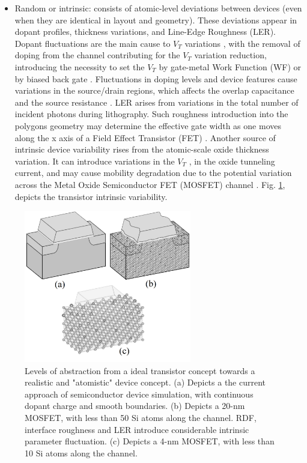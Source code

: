 \documentclass[pgmicro,mestrado,english]{iiufrgs}
\begin{document}
\begin{itemize}
        \item Random or intrinsic: consists of atomic-level deviations between devices (even when they are identical in layout and geometry). These deviations appear in dopant profiles, thickness variations, and Line-Edge Roughness (LER). Dopant fluctuations are the main cause to $V_T$ variations \cite{asenov2003simulation}, with the removal of doping from the channel contributing for the $V_T$ variation reduction, introducing the necessity to set the $V_T$ by gate-metal Work Function (WF) or by biased back gate \cite{frank2001device,wong1999nanoscale}. Fluctuations in doping levels and device features cause variations in the source/drain regions, which affects the overlap capacitance and the source resistance \cite{frank2000simulation}. LER arises from variations in the total number of incident photons during lithography. Such roughness introduction into the polygons geometry may determine the effective gate width as one moves along the x axis of a Field Effect Transistor (FET) \cite{brunner2003optical}.
        Another source of intrinsic device variability rises from the atomic-scale oxide thickness variation. It can introduce variations in the $V_T$ \cite{asenov2003simulation}, in the oxide tunneling current, and may cause mobility degradation due to the potential variation across the Metal Oxide Semiconductor FET (MOSFET) channel \cite{bernstein2006high}. Fig. \ref{fig:transAbs}, depicts the transistor intrinsic variability.
    \end{itemize}

    \begin{figure} [H]
        \centering
        \includegraphics[width=0.65\textwidth, trim={0 0 0 0},clip]{transistorVariability.png}
        \caption{Levels of abstraction from a ideal transistor concept towards a realistic and "atomistic" device concept. (a) Depicts a the current approach of semiconductor device simulation, with continuous dopant charge and smooth boundaries. (b) Depicts a 20-nm MOSFET, with less than 50 Si atoms along the channel. RDF, interface roughness and LER introduce considerable intrinsic parameter fluctuation. (c) Depicts a 4-nm MOSFET, with less than 10 Si atoms along the channel. }
        \label{fig:transAbs}
    \end{figure}
\end{document}
